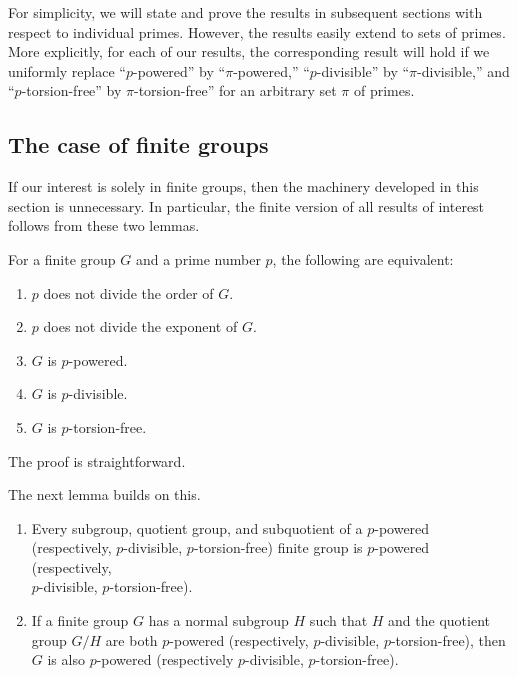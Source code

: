 For simplicity, we will state and prove the results in subsequent
sections with respect to individual primes. However, the results
easily extend to sets of primes. More explicitly, for each of our
results, the corresponding result will hold if we uniformly replace
``$p$-powered'' by ``$\pi$-powered,'' ``$p$-divisible'' by
``$\pi$-divisible,'' and ``$p$-torsion-free'' by
$\pi$-torsion-free'' for an arbitrary set $\pi$ of primes.

\subsection{The case of finite groups}

If our interest is solely in finite groups, then the machinery
developed in this section is unnecessary. In particular, the finite
version of all results of interest follows from these two lemmas.

\begin{lemma}\label{lemma:finite-groups-pi-p-d-t}
  For a finite group $G$ and a prime number $p$, the following are equivalent:

  \begin{enumerate}
  \item $p$ does not divide the order of $G$.
  \item $p$ does not divide the exponent of $G$.
  \item $G$ is $p$-powered.
  \item $G$ is $p$-divisible.
  \item $G$ is $p$-torsion-free.
  \end{enumerate}
\end{lemma}

The proof is straightforward.

The next lemma builds on this.

\begin{lemma}\label{lemma:finite-groups-two-out-of-three}
  \begin{enumerate}
  \item Every subgroup, quotient group, and subquotient of a
    $p$-powered (respectively, $p$-divisible, $p$-torsion-free) finite
    group is $p$-powered (respectively, \\ $p$-divisible,
    $p$-torsion-free).
  \item If a finite group $G$ has a normal subgroup $H$ such that $H$
    and the quotient group $G/H$ are both $p$-powered (respectively,
    $p$-divisible, $p$-torsion-free), then $G$ is also $p$-powered
    (respectively $p$-divisible, $p$-torsion-free).
  \end{enumerate}
\end{lemma}

